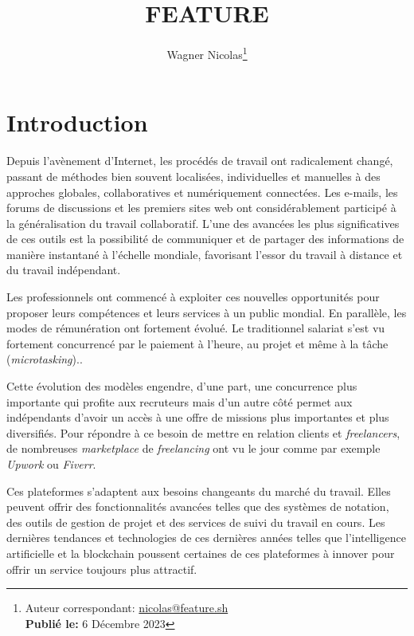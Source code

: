 \documentclass[
	a4paper, %
	10pt, %
	unnumberedsections, %
	twoside, %
]{LTJournalArticle}
\title{FEATURE} %
\author{%
	Wagner Nicolas\thanks{Auteur correspondant: \href{mailto:nicolas@feature.sh}{nicolas@feature.sh}\\ \textbf{Publié le:} 6 Décembre 2023}
}
\begin{document}
\maketitle %


\section{Introduction}

Depuis l'avènement d'Internet, les procédés de travail ont radicalement changé, passant de méthodes bien souvent localisées, individuelles et manuelles à des approches globales, collaboratives et numériquement connectées. Les e-mails, les forums de discussions et les premiers sites web ont considérablement participé à
la généralisation du travail collaboratif. L'une des avancées les plus significatives de ces outils est la possibilité de communiquer et de partager des informations de manière instantané à l'échelle mondiale, favorisant l'essor du travail à distance et du travail indépendant.

Les professionnels ont commencé à exploiter ces nouvelles opportunités pour proposer leurs compétences et leurs services à un public mondial. En parallèle, les modes de rémunération ont fortement évolué. Le traditionnel salariat s'est vu fortement concurrencé par le paiement à l'heure, au projet et même à la tâche (\emph{microtasking})..

Cette évolution des modèles engendre, d'une part, une concurrence plus importante qui profite aux recruteurs mais d'un autre côté permet aux indépendants d'avoir un accès à une offre de missions plus importantes et plus diversifiés. Pour répondre à ce besoin de mettre en relation clients et \emph{freelancers}, de nombreuses \emph{marketplace} de \emph{freelancing} ont vu le jour comme par exemple \emph{Upwork} ou \emph{Fiverr}.

Ces plateformes s'adaptent aux besoins changeants du marché du travail. Elles peuvent offrir des fonctionnalités avancées telles que des systèmes de notation, des outils de gestion de projet et des services de suivi du travail en cours. Les dernières tendances et technologies de ces dernières années telles que l'intelligence artificielle et la blockchain poussent certaines de ces plateformes à innover pour offrir un service toujours plus attractif.
\end{document}

